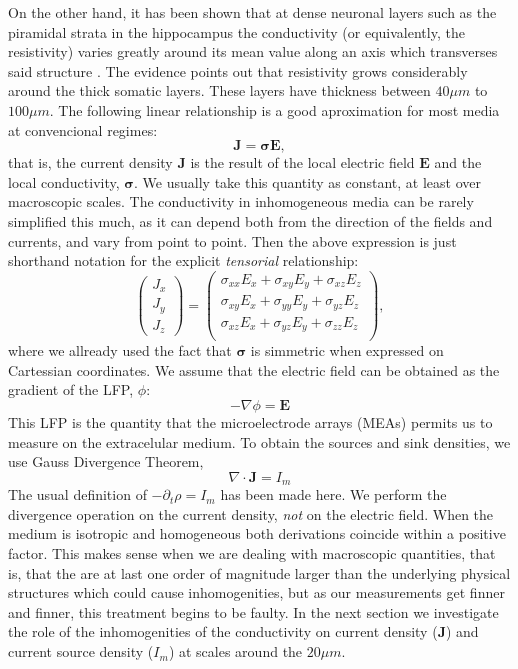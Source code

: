 \documentclass{article}
\newcommand{\Jd}{\mathbf{J}}
\newcommand{\EF}{\mathbf{E}}
\newcommand{\cond}{\boldsymbol{\sigma}}
\begin{document}
On the other hand, it has been shown that at 
dense neuronal layers such as the piramidal
strata in the hippocampus the conductivity (or equivalently,
the resistivity) varies greatly around its mean value along
an axis which transverses said structure
\cite{Holsheimer87, Lopez01, TrevinoPersonal}. 
The evidence points out that resistivity grows 
considerably around the thick somatic layers. These layers 
have thickness between $40\mu m$ to $100 \mu m$.
The following linear relationship is a good aproximation for
most media at convencional regimes: 
\begin{equation}
\Jd=\cond \EF,
\end{equation}
that is, the current density $\Jd$ is the result of the
local electric field $\EF$ and the local conductivity, $\cond$.
We usually take this quantity as constant, 
at least over macroscopic scales.
The conductivity in inhomogeneous media can be rarely
simplified this much, as it can depend both from the direction
of the fields and currents, and vary from point to point. 
Then the above expression is just shorthand notation for the
explicit  \emph{tensorial} relationship:
\begin{equation}
  \begin{pmatrix}
    J_x \\
    J_y \\
    J_z
  \end{pmatrix}
  =
   \begin{pmatrix}
     \sigma_{xx}E_x+ \sigma_{xy}E_y+\sigma_{xz}E_z \\
     \sigma_{xy}E_x+ \sigma_{yy}E_y+\sigma_{yz}E_z \\
     \sigma_{xz}E_x+ \sigma_{yz}E_y+\sigma_{zz}E_z \\
  \end{pmatrix},
\end{equation}
where we allready used the fact that $\cond$ is simmetric when
expressed on Cartessian coordinates.
We assume that the electric field can be obtained as the
gradient of the LFP, $\phi$:
\begin{equation}
  -\nabla \phi=\EF
\end{equation}
This LFP is the quantity that the microelectrode arrays (MEAs) permits us
to measure on the extracelular medium.
To obtain the sources and sink densities, we use Gauss Divergence Theorem,
\begin{equation}
\nabla \cdot \Jd =I_m
\end{equation}
The usual definition of $-\partial_t \rho =I_m$ has been made here. 
We perform the divergence operation on the current density, \emph{not}
on the electric field. When the medium is isotropic and homogeneous
both derivations coincide within a positive factor.
This makes sense when we are dealing with macroscopic quantities,
that is, that the are at last one order of magnitude larger
than the underlying physical structures which could cause 
inhomogenities, but as our measurements get finner and finner,
this treatment begins to be faulty. 
In the next section we investigate the role of the inhomogenities 
of the conductivity on current density
($\Jd$) and current source density ($I_m$) at scales around
the $20\mu m$. 
\end{document}
